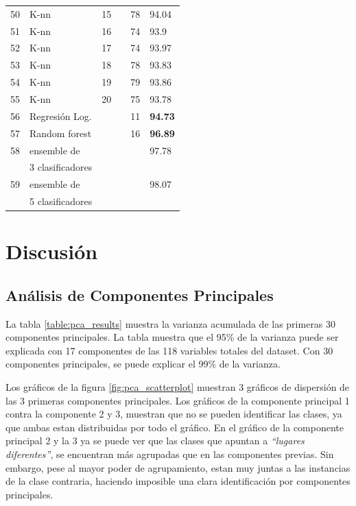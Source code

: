 \documentclass[journal]{IEEEtran}
\begin{document}
\begin{table}[!hb]
\begin{tabular}{l | l l l | l l}
	50	&	K-nn	&	15	&		&	78	&	94.04 \\
	51	&	K-nn	&	16	&		&	74	&	93.9 \\
	52	&	K-nn	&	17	&		&	74	&	93.97 \\
	53	&	K-nn	&	18	&		&	78	&	93.83 \\
	54	&	K-nn	&	19	&		&	79	&	93.86 \\
	55	&	K-nn	&	20	&		&	75	&	93.78 \\
\hline
	56	& Regresión Log. &		&		&	11      &  \textbf{94.73} \\
\hline
	57	& Random forest	&		&		&	16	&  \textbf{96.89} \\
\hline
	58	&  ensemble de &	  	&		&		&	97.78 \\
		&  3 clasificadores &		&		&		&	      \\
\hline
	59	&  ensemble de &	  	&		&		&	98.07 \\
		&  5 clasificadores &		&		&		&	      \\

\end{tabular}
\end{table}


\section{Discusión}
\subsection{Análisis de Componentes Principales}
La tabla \ref{table:pca_results} muestra la varianza acumulada de las
primeras 30 componentes principales. La tabla muestra que el 95\%
de la varianza puede ser explicada con 17 componentes de las 118 variables
totales del dataset. Con 30 componentes principales, se puede explicar
el 99\% de la varianza.

Los gráficos de la figura \ref{fig:pca_scatterplot} muestran 3 
gráficos de dispersión de
las 3 primeras componentes principales. Los gráficos de la componente principal 1 
contra la componente 2 y 3, muestran que no se pueden identificar las clases, ya
que ambas estan distribuidas por todo el gráfico. En el gráfico de la
componente principal 2 y la 3 ya se puede ver que las clases que apuntan
a \textit{``lugares diferentes''}, se encuentran más agrupadas que en las componentes
previas. Sin embargo, pese al mayor poder de agrupamiento, estan muy juntas a
las instancias de la clase contraria, haciendo imposible una clara identificación por
componentes principales.
\end{document}
